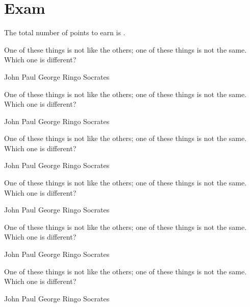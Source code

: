 \documentclass[a4paper,answers,addpoints]{exam}
\begin{document}
\section*{Exam}
The total number of points to earn is \numpoints.

\hrulefill


\begin{questions}




\question[5]
One of these things is not like the others; one of these
things is not the same. Which one is different?

\begin{randomizechoices}
\choice John
\choice Paul
\choice George
\choice Ringo
\CorrectChoice Socrates
\end{randomizechoices}

\question[5]
One of these things is not like the others; one of these
things is not the same. Which one is different?

\begin{randomizeoneparchoices}
\choice John
\choice Paul
\choice George
\choice Ringo
\CorrectChoice Socrates
\end{randomizeoneparchoices}

\question[5]
One of these things is not like the others; one of these
things is not the same. Which one is different?

\begin{randomizecheckboxes}
\choice John
\choice Paul
\choice George
\choice Ringo
\CorrectChoice Socrates
\end{randomizecheckboxes}

\question[5]
One of these things is not like the others; one of these
things is not the same. Which one is different?

\begin{randomizeoneparcheckboxes}
\choice John
\choice Paul
\choice George
\choice Ringo
\CorrectChoice Socrates
\end{randomizeoneparcheckboxes}

\question[5]
One of these things is not like the others; one of these
things is not the same. Which one is different?

\begin{randomizecheckboxes}
\choice John
\choice Paul
\choice George
\choice Ringo
\CorrectChoice Socrates
\end{randomizecheckboxes}

\question[5]
One of these things is not like the others; one of these
things is not the same. Which one is different?
\begin{randomizeoneparcheckboxes}[nokeeplast]
\choice John
\choice Paul
\choice George
\choice Ringo
\CorrectChoice Socrates
\end{randomizeoneparcheckboxes}


\end{questions}
\end{document}
